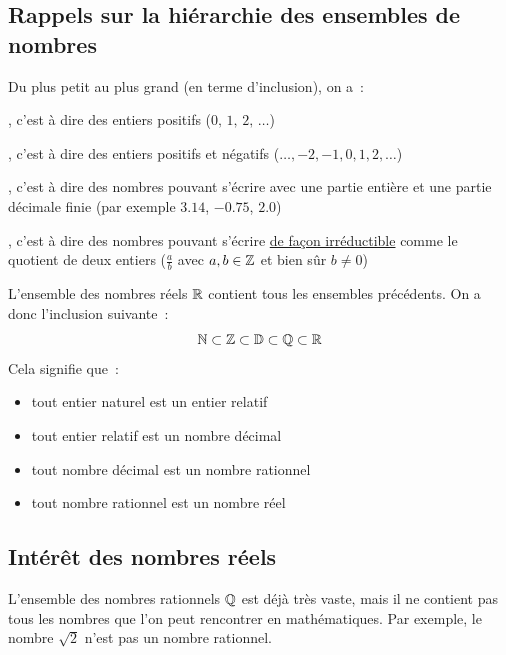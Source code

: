 \subsection{Rappels sur la hiérarchie des ensembles de nombres}
Du plus petit au plus grand (en terme d'inclusion), on a~:
\begin{enumeratebf}
    \item {}, c'est à dire des entiers positifs ($0,\, 1,\, 2,\, \dots$)
    \item {}, c'est à dire des entiers positifs et négatifs ($\dots, -2, -1, 0, 1, 2, \dots$)
    \item {}, c'est à dire des nombres pouvant s'écrire avec une partie entière et une partie décimale finie (par exemple $3.14$, $-0.75$, $2.0$)
    \item {}, c'est à dire des nombres pouvant s'écrire \underline{de façon irréductible} comme le quotient de deux entiers ($\frac{a}{b}$ avec $a, b \in \mathbb{Z}$ et bien sûr $b \neq 0$)
\end{enumeratebf}
\vspace{1em}
L'ensemble des nombres réels $\mathbb{R}$ contient tous les ensembles précédents. On a donc l'inclusion suivante~:
$$ \mathbb{N} \subset \mathbb{Z} \subset \mathbb{D} \subset \mathbb{Q} \subset \mathbb{R} $$
Cela signifie que~:
\begin{itemize}
    \item tout entier naturel est un entier relatif
    \item tout entier relatif est un nombre décimal
    \item tout nombre décimal est un nombre rationnel
    \item tout nombre rationnel est un nombre réel
\end{itemize}
\newpage
\subsection{Intérêt des nombres réels}

L'ensemble des nombres rationnels $\mathbb{Q}$ est déjà très vaste, mais il ne contient pas tous les nombres que l'on peut rencontrer en mathématiques. Par exemple, le nombre $\sqrt{2}$ n'est pas un nombre rationnel.

